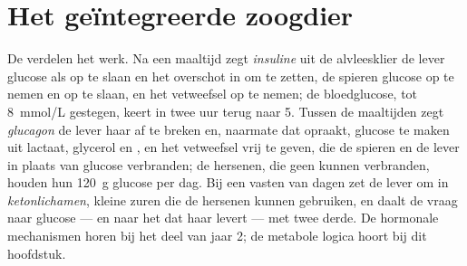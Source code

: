 \section{Het geïntegreerde zoogdier}

\begin{proposition}\label{prop:b1:biosyntheses-integration:fedfasting}
De  verdelen het werk. Na een maaltijd zegt \emph{insuline} uit de
alvleesklier de lever glucose als  op te slaan en het overschot in  om
te zetten, de spieren glucose op te nemen en  op te slaan, en het
vetweefsel  op te nemen; de bloedglucose, tot \qty{8}{mmol/L} gestegen, keert in
twee uur terug naar \qty{5}{}. Tussen de maaltijden zegt \emph{glucagon} de lever
haar  af te breken en, naarmate dat opraakt, glucose te maken uit lactaat,
glycerol en , en het vetweefsel  vrij te geven, die de spieren en
de lever in plaats van glucose verbranden; de hersenen, die geen  kunnen
verbranden, houden hun \qty{120}{g} glucose per dag. Bij een vasten van dagen zet
de lever  om in \emph{ketonlichamen}, kleine zuren die de hersenen kunnen
gebruiken, en daalt de vraag naar glucose --- en naar het  dat haar levert ---
met twee derde. De hormonale mechanismen horen bij het deel van jaar 2; de
metabole logica hoort bij dit hoofdstuk.
\end{proposition}

